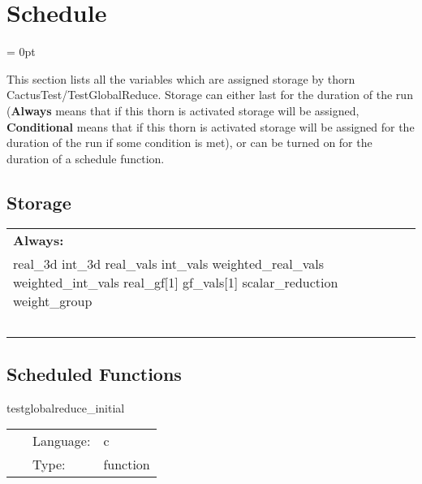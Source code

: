 
\section{Schedule} 


\parskip = 0pt


\noindent This section lists all the variables which are assigned storage by thorn CactusTest/TestGlobalReduce.  Storage can either last for the duration of the run ({\bf Always} means that if this thorn is activated storage will be assigned, {\bf Conditional} means that if this thorn is activated storage will be assigned for the duration of the run if some condition is met), or can be turned on for the duration of a schedule function.


\subsection*{Storage}

\hspace{5mm}

 \begin{tabular*}{160mm}{ll} 

{\bf Always:}&  ~ \\ 
 real\_3d int\_3d real\_vals int\_vals weighted\_real\_vals weighted\_int\_vals real\_gf[1] gf\_vals[1] scalar\_reduction weight\_group & ~\\ 
~ & ~\\ 
\end{tabular*} 


\subsection*{Scheduled Functions}
\vspace{5mm}


\hspace{5mm} testglobalreduce\_initial 

\hspace{5mm}{\it initialize the input arrays to values } 


\hspace{5mm}

 \begin{tabular*}{160mm}{cll} 
~ & Language:  & c \\ 
~ & Type:  & function \\ 
\end{tabular*} 


\vspace{5mm}

